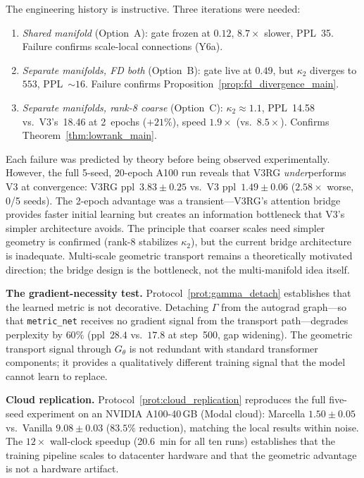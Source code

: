 \documentclass[11pt,a4paper]{article}
\theoremstyle{definition}
\theoremstyle{remark}
\begin{document}
The engineering history is instructive. Three iterations were 
needed:
\begin{enumerate}[nosep]
  \item \emph{Shared manifold} (Option~A): gate frozen at 
  $0.12$, $8.7\times$ slower, PPL~35. Failure confirms 
  scale-local connections (Y6a).
  \item \emph{Separate manifolds, FD both} (Option~B): gate live 
  at $0.49$, but $\kappa_2$ diverges to $553$, PPL~$\sim\!16$. 
  Failure confirms Proposition~\ref{prop:fd_divergence_main}.
  \item \emph{Separate manifolds, rank-8 coarse} (Option~C): 
  $\kappa_2 \approx 1.1$, PPL~14.58 vs.\ V3's~18.46 at 
  2~epochs ($+21\%$), speed $1.9\times$ (vs.\ $8.5\times$). 
  Confirms Theorem~\ref{thm:lowrank_main}.
\end{enumerate}
Each failure was predicted by theory before being observed 
experimentally. However, the full 5-seed, 20-epoch A100 run 
reveals that V3RG \emph{under}performs V3 at convergence: 
V3RG ppl~$3.83 \pm 0.25$ vs.\ V3 ppl~$1.49 \pm 0.06$ 
($2.58\times$ worse, 0/5 seeds). The 2-epoch advantage was a 
transient---V3RG's attention bridge provides faster initial 
learning but creates an information bottleneck that V3's simpler 
architecture avoids. The principle that coarser scales need 
simpler geometry is confirmed (rank-8 stabilizes $\kappa_2$), 
but the current bridge architecture is inadequate. Multi-scale 
geometric transport remains a theoretically motivated direction; 
the bridge design is the bottleneck, not the multi-manifold 
idea itself.

\medskip

\textbf{The gradient-necessity test.} 
Protocol~\ref{prot:gamma_detach} establishes that the learned 
metric is not decorative. Detaching $\Gamma$ from the autograd 
graph---so that \texttt{metric\_net} receives no gradient signal 
from the transport path---degrades perplexity by $60\%$ 
(ppl~$28.4$ vs.\ $17.8$ at step~500, gap widening). The 
geometric transport signal through $G_\theta$ is not redundant 
with standard transformer components; it provides a 
qualitatively different training signal that the model cannot 
learn to replace.

\medskip

\textbf{Cloud replication.} Protocol~\ref{prot:cloud_replication} 
reproduces the full five-seed experiment on an NVIDIA A100-40\,GB 
(Modal cloud): Marcella $1.50 \pm 0.05$ vs.\ Vanilla $9.08 \pm 
0.03$ ($83.5\%$ reduction), matching the local results within 
noise. The $12\times$ wall-clock speedup (20.6~min for all ten 
runs) establishes that the training pipeline scales to datacenter 
hardware and that the geometric advantage is not a hardware 
artifact.
\end{document}

